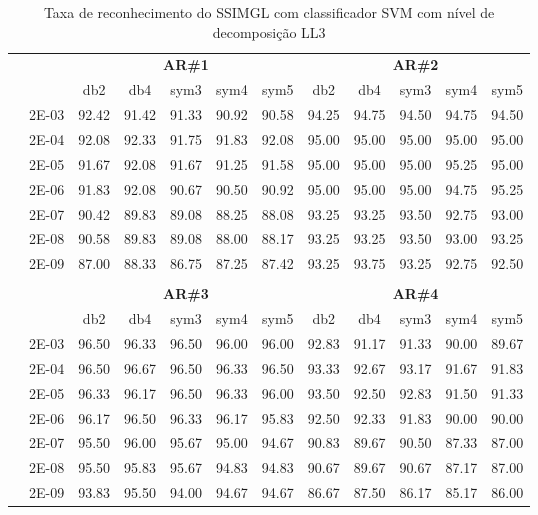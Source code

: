 \begin{table}[H]
	\centering
    \normalsize
	\caption{Taxa de reconhecimento do SSIMGL com classificador SVM com nível de decomposição LL3}
	\begin{tabular}{|c|c|c c c c c|c c c c c|}
\cline{3-12}
\multicolumn{2}{c|}{\multirow{2}{*}{}} & \multicolumn{5}{c|}{\textbf{AR\#1}}  & \multicolumn{5}{c|}{\textbf{AR\#2}} \\\cline{3-12}

\multicolumn{2}{c|}{}  & db2 & db4 & sym3 & sym4 & sym5 & db2 & db4& sym3 & sym4 & sym5 \\\hline
\multicolumn{1}{|c|}{ \multirow{6}{*}{\rotatebox[origin=c]{90}{\textbf{Gamma}}} }
&2E-03&	92.42&	91.42&	91.33&	90.92&	90.58&	94.25&	94.75&	94.50&	94.75&	94.50	\\\cline{2-12}
&2E-04&	92.08&	92.33&	91.75&	91.83&	92.08&	95.00&	95.00&	95.00&	95.00&	95.00	\\\cline{2-12}
&2E-05&	91.67&	92.08&	91.67&	91.25&	91.58&	95.00&	95.00&	95.00&	95.25&	95.00	\\\cline{2-12}
&2E-06&	91.83&	92.08&	90.67&	90.50&	90.92&	95.00&	95.00&	95.00&	94.75&	95.25	\\\cline{2-12}
&2E-07&	90.42&	89.83&	89.08&	88.25&	88.08&	93.25&	93.25&	93.50&	92.75&	93.00	\\\cline{2-12}
&2E-08&	90.58&	89.83&	89.08&	88.00&	88.17&	93.25&	93.25&	93.50&	93.00&	93.25	\\\cline{2-12}
&2E-09&	87.00&	88.33&	86.75&	87.25&	87.42&	93.25&	93.75&	93.25&	92.75&	92.50	



	
\\ \midrule
\multicolumn{12}{c}{}\\ 

\cline{3-12}
\multicolumn{2}{c}{} & \multicolumn{5}{|c|}{\textbf{AR\#3}}  & \multicolumn{5}{c|}{\textbf{AR\#4}} \\\cline{3-12}
\multicolumn{2}{c}{}  & \multicolumn{1}{|c}{db2} & db4 & sym3 & sym4 & sym5 & db2 & db4& sym3 & sym4 & sym5 \\\hline
\multicolumn{1}{|c|}{ \multirow{6}{*}{\rotatebox[origin=c]{90}{\textbf{Gamma}}} }
&2E-03&	96.50&	96.33&	96.50&	96.00&	96.00&	92.83&	91.17&	91.33&	90.00&	89.67	\\\cline{2-12}
&2E-04&	96.50&	96.67&	96.50&	96.33&	96.50&	93.33&	92.67&	93.17&	91.67&	91.83	\\\cline{2-12}
&2E-05&	96.33&	96.17&	96.50&	96.33&	96.00&	93.50&	92.50&	92.83&	91.50&	91.33	\\\cline{2-12}
&2E-06&	96.17&	96.50&	96.33&	96.17&	95.83&	92.50&	92.33&	91.83&	90.00&	90.00	\\\cline{2-12}
&2E-07&	95.50&	96.00&	95.67&	95.00&	94.67&	90.83&	89.67&	90.50&	87.33&	87.00	\\\cline{2-12}
&2E-08&	95.50&	95.83&	95.67&	94.83&	94.83&	90.67&	89.67&	90.67&	87.17&	87.00	\\\cline{2-12}
&2E-09&	93.83&	95.50&	94.00&	94.67&	94.67&	86.67&	87.50&	86.17&	85.17&	86.00	
	

\end{tabular}
\end{table}
